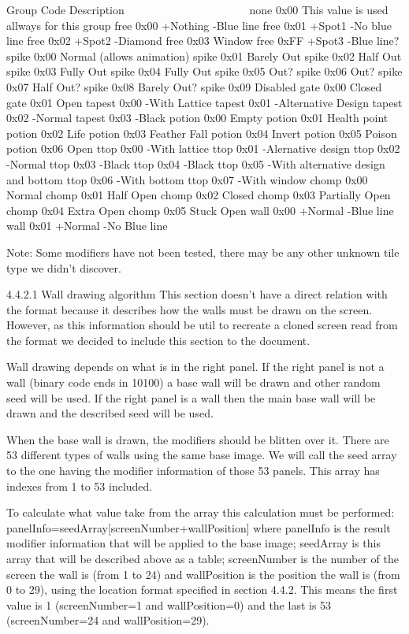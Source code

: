   Group  Code Description
  ~~~~~  ~~~~ ~~~~~~~~~~~
  none   0x00 This value is used allways for this group
  free   0x00 +Nothing -Blue line
  free   0x01 +Spot1   -No blue line
  free   0x02 +Spot2   -Diamond
  free   0x03 Window
  free   0xFF +Spot3   -Blue line?
  spike  0x00 Normal (allows animation)
  spike  0x01 Barely Out
  spike  0x02 Half Out
  spike  0x03 Fully Out
  spike  0x04 Fully Out
  spike  0x05 Out?
  spike  0x06 Out?
  spike  0x07 Half Out?
  spike  0x08 Barely Out?
  spike  0x09 Disabled
  gate   0x00 Closed
  gate   0x01 Open
  tapest 0x00 -With Lattice
  tapest 0x01 -Alternative Design
  tapest 0x02 -Normal
  tapest 0x03 -Black
  potion 0x00 Empty
  potion 0x01 Health point
  potion 0x02 Life
  potion 0x03 Feather Fall
  potion 0x04 Invert
  potion 0x05 Poison
  potion 0x06 Open
  ttop   0x00 -With lattice
  ttop   0x01 -Alernative design
  ttop   0x02 -Normal
  ttop   0x03 -Black
  ttop   0x04 -Black
  ttop   0x05 -With alternative design and bottom
  ttop   0x06 -With bottom
  ttop   0x07 -With window
  chomp  0x00 Normal
  chomp  0x01 Half Open
  chomp  0x02 Closed
  chomp  0x03 Partially Open
  chomp  0x04 Extra Open
  chomp  0x05 Stuck Open
  wall   0x00 +Normal  -Blue line
  wall   0x01 +Normal  -No Blue line

 Note: Some modifiers have not been tested, there may be any other unknown
       tile type we didn't discover.


4.4.2.1 Wall drawing algorithm
 This section doesn't have a direct relation with the format because it
 describes how the walls must be drawn on the screen. However, as this
 information should be util to recreate a cloned screen read from the
 format we decided to include this section to the document.

 Wall drawing depends on what is in the right panel. If the right panel
 is not a wall (binary code ends in 10100) a base wall will be drawn and
 other random seed will be used. If the right panel is a wall then the main
 base wall will be drawn and the described seed will be used.

 When the base wall is drawn, the modifiers should be blitten over it.
 There are 53 different types of walls using the same base image.
 We will call the seed array to the one having the modifier information of
 those 53 panels. This array has indexes from 1 to 53 included.

 To calculate what value take from the array this calculation must be
 performed: panelInfo=seedArray[screenNumber+wallPosition]
 where panelInfo is the result modifier information that will be applied to
 the base image; seedArray is this array that will be described above as a
 table; screenNumber is the number of the screen the wall is (from 1 to 24)
 and wallPosition is the position the wall is (from 0 to 29), using the
 location format specified in section 4.4.2. This means the first value is
 1 (screenNumber=1 and wallPosition=0) and the last is 53 (screenNumber=24
 and wallPosition=29).

